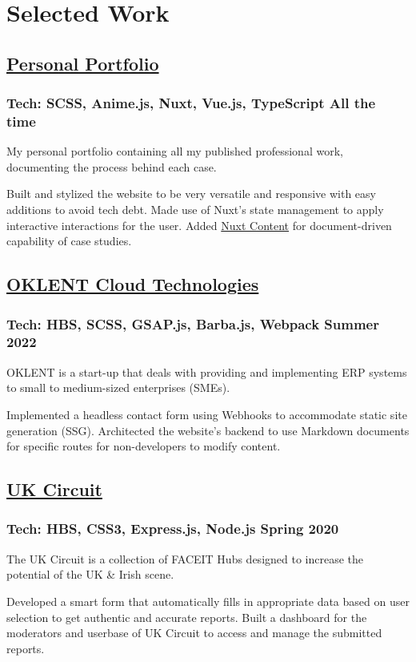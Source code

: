 \section*{Selected Work}
%
%
%
%
%
%
\subsection*{
	\href{https://bumbleboss.xyz/}{Personal Portfolio}
}
\subsubsection*{
	Tech: SCSS, Anime.js, Nuxt, Vue.js, TypeScript
	\hspace*{\fill}
	All the time
}
My personal portfolio containing all my published professional work, documenting the
process behind each case.
\vspace{2mm}
\begin{tasks}
	\task Built and stylized the website to be very versatile and responsive with easy
	additions to avoid tech debt.
	\task Made use of Nuxt's state management to apply interactive interactions for
	the user.
	\task Added \href{https://content.nuxtjs.org/}{Nuxt Content} for document-driven
	capability of case studies.
\end{tasks}
%
%
%
%
\subsection*{
	\href{https://oklent.com/}{OKLENT Cloud Technologies}
}
\subsubsection*{
	Tech: HBS, SCSS, GSAP.js, Barba.js, Webpack
	\hspace*{\fill}
	Summer 2022
}
OKLENT is a start-up that deals with providing and implementing ERP systems
to small to medium-sized enterprises (SMEs).
\vspace{2mm}
\begin{tasks}
	\task Implemented a headless contact form using Webhooks to accommodate static
	site generation (SSG).
	\task Architected the website’s backend to use Markdown documents for
	specific routes for non-developers to modify content.
\end{tasks}
%
%
%
%
\subsection*{
	\href{https://bumbleboss.xyz/w/uk-circuit}{UK Circuit}
}
\subsubsection*{
	Tech: HBS, CSS3, Express.js, Node.js
	\hspace*{\fill}
	Spring 2020
}
The UK Circuit is a collection of FACEIT Hubs designed to increase the potential of the
UK \& Irish scene.
\begin{tasks}
	\task Developed a smart form that automatically fills in appropriate data based on
	user selection to get authentic and accurate reports.
	\task Built a dashboard for the moderators and userbase of UK Circuit to access and manage
	the submitted reports.
\end{tasks}
%
%
%
%
